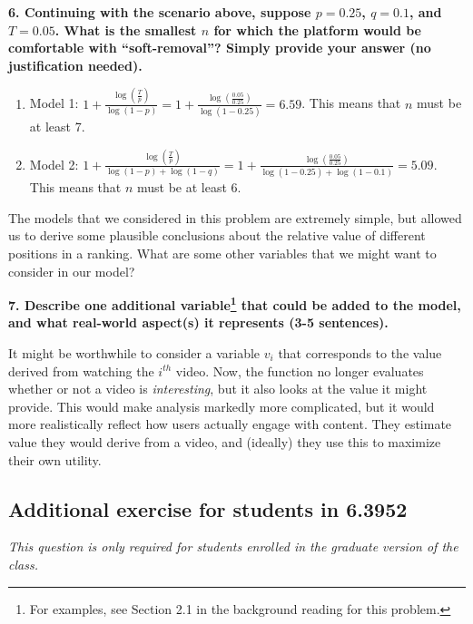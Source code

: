 \documentclass{article}
\begin{document}
\textbf{6. Continuing with the scenario above, suppose $p=0.25$, $q=0.1$, and $T=0.05$. What is the smallest $n$ for which the platform would be comfortable with ``soft-removal''? Simply provide your answer (no justification needed).}
\bigskip
\begin{mdframed}
\begin{enumerate}[label=\Alph*.]
    \item Model 1: $1 + \frac{\log(\frac{T}{p})}{\log(1-p)}= 1 + \frac{\log(\frac{0.05}{0.25})}{\log(1-0.25)} = 6.59$. This means that $n$ must be at least 7.
    \item Model 2: $1 + \frac{\log(\frac{T}{p})}{\log(1-p) + \log(1-q)}= 1 + \frac{\log(\frac{0.05}{0.25})}{\log(1-0.25) + \log(1-0.1)} = 5.09$. This means that $n$ must be at least $6$.
\end{enumerate}
\end{mdframed}
\bigskip



The models that we considered in this problem are extremely simple, but allowed us to derive some plausible conclusions about the relative value of different positions in a ranking. What are some other variables that we might want to consider in our model?

\textbf{7. Describe one additional variable\footnote{For examples, see Section 2.1 in the background reading for this problem.} that could be added to the model, and what real-world aspect(s) it represents (3-5 sentences).}

\bigskip
\begin{mdframed}
It might be worthwhile to consider a variable $v_i$ that corresponds to the value derived from watching the $i^{th}$ video. Now, the function no longer evaluates whether or not a video is \textit{interesting}, but it also looks at the value it might provide. This would make analysis markedly more complicated, but it would more realistically reflect how users actually engage with content. They estimate value they would derive from a video, and (ideally) they use this to maximize their own utility. 
\end{mdframed}
\bigskip

\subsection*{Additional exercise for students in 6.3952}

\textit{This question is only required for students enrolled in the graduate version of the class.}
\end{document}
